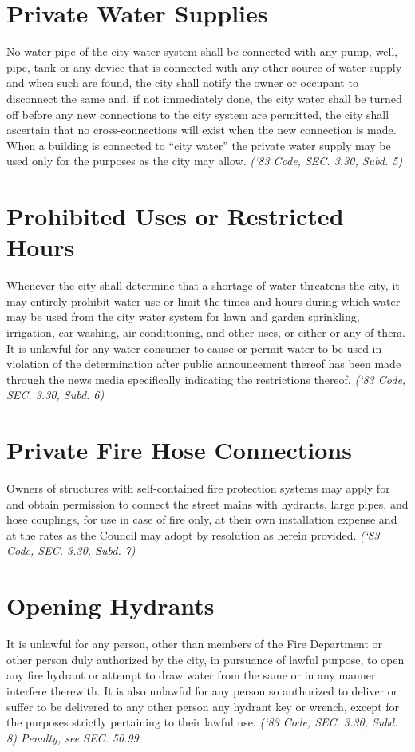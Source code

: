 \section{Private Water Supplies}
No water pipe of the city water system shall be connected with any pump, well, pipe, tank or any device that is connected with any other source of water supply and when such are found, the city shall notify the owner or occupant to disconnect the same and, if not immediately done, the city water shall be turned off before any new connections to the city system are permitted, the city shall ascertain that no cross-connections will exist when the new connection is made. When a building is connected to “city water” the private water supply may be used only for the purposes as the city may allow.\newline
\emph{(‘83 Code, SEC. 3.30, Subd. 5)}
\section{Prohibited Uses or Restricted Hours}
Whenever the city shall determine that a shortage of water threatens the city, it may entirely prohibit water use or limit the times and hours during which water may be used from the city water system for lawn and garden sprinkling, irrigation, car washing, air conditioning, and other uses, or either or any of them.  It is unlawful for any water consumer to cause or permit water to be used in violation of the determination after public announcement thereof has been made through the news media specifically indicating the restrictions thereof.\newline
\emph{(‘83 Code, SEC. 3.30, Subd. 6)}
\section{Private Fire Hose Connections}
Owners of structures with self-contained fire protection systems may apply for and obtain permission to connect the street mains with hydrants, large pipes, and hose couplings, for use in case of fire only, at their own installation expense and at the rates as the Council may adopt by resolution as herein provided.\newline
\emph{(‘83 Code, SEC. 3.30, Subd. 7)}
\section{Opening Hydrants}
It is unlawful for any person, other than members of the Fire Department or other person duly authorized by the city, in pursuance of lawful purpose, to open any fire hydrant or attempt to draw water from the same or in any manner interfere therewith.  It is also unlawful for any person so authorized to deliver or suffer to be delivered to any other person any hydrant key or wrench, except for the purposes strictly pertaining to their lawful use.\newline
\emph{(‘83 Code, SEC. 3.30, Subd. 8)  Penalty, see SEC. 50.99}
